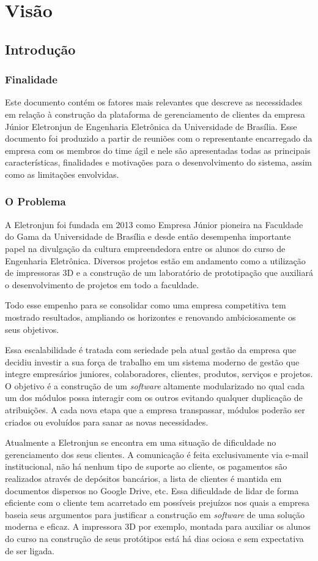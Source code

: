 \chapter{Visão}
  \section{Introdução}
    \subsection{Finalidade}
Este documento contém os fatores mais relevantes que descreve as necessidades em relação à construção da plataforma de gerenciamento de clientes da empresa Júnior Eletronjun de Engenharia Eletrônica da Universidade de Brasília. Esse documento foi produzido a partir de reuniões com o representante encarregado da empresa com os membros do time ágil e nele são apresentadas todas as principais características, finalidades e motivações para o desenvolvimento do sistema, assim como as limitações envolvidas. 

    \subsection{O Problema}
A Eletronjun foi fundada em 2013 como Empresa Júnior pioneira na Faculdade do Gama da Universidade de Brasília e desde então desempenha importante papel na divulgação da cultura empreendedora entre os alunos do curso de Engenharia Eletrônica. Diversos projetos estão em andamento como a utilização de impressoras 3D e a construção de um laboratório de prototipação que auxiliará o desenvolvimento de projetos em todo a faculdade.

Todo esse empenho para se consolidar como uma empresa competitiva tem mostrado resultados, ampliando os horizontes e renovando ambiciosamente os seus objetivos.

Essa escalabilidade é tratada com seriedade pela atual gestão da empresa que decidiu investir a sua força de trabalho em um sistema moderno de gestão que integre empresários juniores, colaboradores, clientes, produtos, serviços e projetos. O objetivo é a construção de um \textit{software} altamente modularizado no qual cada um dos módulos possa interagir com os outros evitando qualquer duplicação de atribuições. A cada nova etapa que a empresa transpassar, módulos poderão ser criados ou evoluídos para sanar as novas necessidades.

Atualmente a Eletronjun se encontra em uma situação de dificuldade no gerenciamento dos seus clientes. A comunicação é feita exclusivamente via e-mail institucional, não há nenhum tipo de suporte ao cliente, os pagamentos são realizados através de depósitos bancários, a lista de clientes é mantida em documentos dispersos no Google Drive, etc. Essa dificuldade de lidar de forma eficiente com o cliente tem acarretado em possíveis prejuízos nos quais a empresa baseia seus argumentos para justificar a construção em \textit{software} de uma solução moderna e eficaz. A impressora 3D por exemplo, montada para auxiliar os alunos do curso na construção de seus protótipos está há dias ociosa e sem expectativa de ser ligada.

